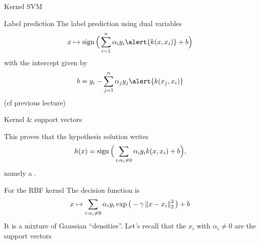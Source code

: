 \documentclass[xcolor={usenames,dvipsnames}]{beamer}
\begin{document}
 \begin{frame}{Kernel SVM}
 \begin{block}{Label prediction}
  The label prediction using dual variables
  \begin{equation*}
    x \mapsto \sign\Big(  \sum_{i=1}^n \alpha_i y_i 
    \alert{k(x, x_i)} + b \Big)
  \end{equation*}
  with the intercept given by
  \begin{equation*}
    b = y_i - \sum_{j=1}^n \alpha_j y_j  \alert{k(x_j, x_i)}
  \end{equation*}
   (cf previous lecture)
  \end{block}
 \end{frame}
%
%
%
%
\begin{frame}{Kernel \& support vectors}

  This proves that the hypothesis solution writes
  \begin{equation*}
     h(x) = \operatorname{sign}\Big(\sum_{i: \alpha_i\neq 0} \alpha_i y_i k(x, x_i) + b \Big),
  \end{equation*}
  namely a .

  \bigskip

\begin{block}{For the RBF kernel}
  The decision function is
  \begin{equation*}
    x \mapsto \sum_{i : \alpha_i \neq 0} \alpha_i y_i \exp\big( -\gamma \left\| x -
        x_i \right\|_2^2 \big) + b
  \end{equation*}
  It is a mixture of Gaussian ``densities''. Let's recall that the $x_i$ with $\alpha_i \neq 0$ are the support vectors
  \end{block}
  
  \end{frame}
  

%  
\end{document}
